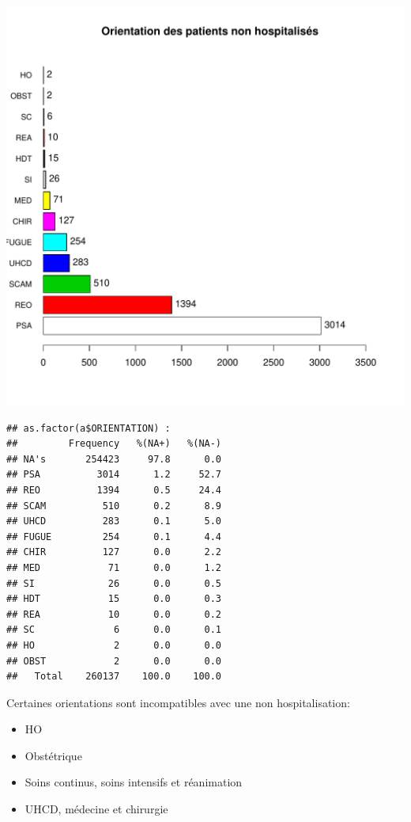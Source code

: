 \documentclass[12pt,english,french,twoside]{report}\usepackage[]{graphicx}\usepackage[]{color}
\makeatletter
\def\maxwidth{ %
  \ifdim\Gin@nat@width>\linewidth
    \linewidth
  \else
    \Gin@nat@width
  \fi
}
\newenvironment{kframe}{%
 \def\at@end@of@kframe{}%
 \ifinner\ifhmode%
  \def\at@end@of@kframe{\end{minipage}}%
  \begin{minipage}{\columnwidth}%
 \fi\fi%
 \def\FrameCommand##1{\hskip\@totalleftmargin \hskip-\fboxsep
 \colorbox{shadecolor}{##1}\hskip-\fboxsep
     \hskip-\linewidth \hskip-\@totalleftmargin \hskip\columnwidth}%
 \MakeFramed {\advance\hsize-\width
   \@totalleftmargin\z@ \linewidth\hsize
   \@setminipage}}%
 {\par\unskip\endMakeFramed%
 \at@end@of@kframe}
\newenvironment{knitrout}{}{} %
\makeatother
\begin{document}
\begin{knitrout}
\includegraphics[width=\maxwidth]{figure/fausses_sorties} 
\begin{kframe}\begin{verbatim}
## as.factor(a$ORIENTATION) : 
##         Frequency   %(NA+)   %(NA-)
## NA's       254423     97.8      0.0
## PSA          3014      1.2     52.7
## REO          1394      0.5     24.4
## SCAM          510      0.2      8.9
## UHCD          283      0.1      5.0
## FUGUE         254      0.1      4.4
## CHIR          127      0.0      2.2
## MED            71      0.0      1.2
## SI             26      0.0      0.5
## HDT            15      0.0      0.3
## REA            10      0.0      0.2
## SC              6      0.0      0.1
## HO              2      0.0      0.0
## OBST            2      0.0      0.0
##   Total    260137    100.0    100.0
\end{verbatim}
\end{kframe}
\end{knitrout}

Certaines orientations sont incompatibles avec une non hospitalisation:
\begin{itemize}
  \item HO
  \item Obstétrique
  \item Soins continus, soins intensifs et réanimation
  \item UHCD, médecine et chirurgie
  
\end{itemize}
\end{document}
